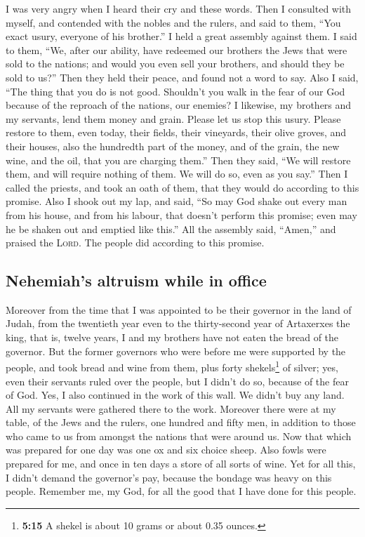  I was very angry when I heard their cry and these words.
 Then I consulted with myself, and contended with the
nobles and the rulers, and said to them, ``You exact usury, everyone of
his brother.'' I held a great assembly against them.  I
said to them, ``We, after our ability, have redeemed our brothers the
Jews that were sold to the nations; and would you even sell your
brothers, and should they be sold to us?'' Then they held their peace,
and found not a word to say.  Also I said, ``The thing
that you do is not good. Shouldn't you walk in the fear of our God
because of the reproach of the nations, our enemies?  I
likewise, my brothers and my servants, lend them money and grain. Please
let us stop this usury.  Please restore to them, even
today, their fields, their vineyards, their olive groves, and their
houses, also the hundredth part of the money, and of the grain, the new
wine, and the oil, that you are charging them.''  Then
they said, ``We will restore them, and will require nothing of them. We
will do so, even as you say.'' Then I called the priests, and took an
oath of them, that they would do according to this promise.
 Also I shook out my lap, and said, ``So may God shake
out every man from his house, and from his labour, that doesn't perform
this promise; even may he be shaken out and emptied like this.'' All the
assembly said, ``Amen,'' and praised the \textsc{Lord}. The people did
according to this promise.

\hypertarget{nehemiahs-altruism-while-in-office}{%
\subsection{Nehemiah's altruism while in
office}\label{nehemiahs-altruism-while-in-office}}

 Moreover from the time that I was appointed to be their
governor in the land of Judah, from the twentieth year even to the
thirty-second year of Artaxerxes the king, that is, twelve years, I and
my brothers have not eaten the bread of the governor. 
But the former governors who were before me were supported by the
people, and took bread and wine from them, plus forty shekels\footnote{\textbf{5:15}
  A shekel is about 10 grams or about 0.35 ounces.} of silver; yes, even
their servants ruled over the people, but I didn't do so, because of the
fear of God.  Yes, I also continued in the work of this
wall. We didn't buy any land. All my servants were gathered there to the
work.  Moreover there were at my table, of the Jews and
the rulers, one hundred and fifty men, in addition to those who came to
us from amongst the nations that were around us.  Now
that which was prepared for one day was one ox and six choice sheep.
Also fowls were prepared for me, and once in ten days a store of all
sorts of wine. Yet for all this, I didn't demand the governor's pay,
because the bondage was heavy on this people.  Remember
me, my God, for all the good that I have done for this people.


